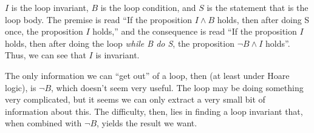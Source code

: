 $I$ is the loop invariant, $B$ is the loop condition, and $S$ is the
statement that is the loop body. The premise is read ``If the
proposition $I \land B$ holds, then after doing S once, the
proposition $I$ holds,'' and the consequence is read ``If the
proposition $I$ holds, then after doing the loop \textit{while B do
  S}, the proposition $\lnot B \land I$ holds''. Thus, we can see that
$I$ is invariant.

The only information we can ``get out'' of a loop, then (at least
under Hoare logic), is $\lnot B$, which doesn't seem very useful. The
loop may be doing something very complicated, but it seems we can only
extract a very small bit of information about this. The difficulty,
then, lies in finding a loop invariant that, when combined with $\lnot
B$, yields the result we want.

